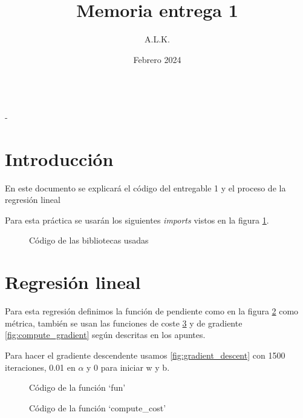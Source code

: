 \documentclass[6pt]{AiTex}
\title{Memoria entrega 1}
\author{A.L.K.}
\date{Febrero 2024}
\begin{document}
\justify

\begin{center}

    {\huge \textbf{\underline{\subtitulo}}} \\
    { \lesson - \autor}

\end{center}


\section*{Introducción}

En este documento se explicará el código del entregable 1 y el proceso de la regresión lineal

Para esta práctica se usarán los siguientes \textit{imports} vistos en la figura \ref{fig:imports}.
\begin{figure}[H]
    \centering
    
    \caption{Código de las bibliotecas usadas}
    \label{fig:imports}
\end{figure}

\section{Regresión lineal}

Para esta regresión definimos la función de pendiente como en la figura \ref{fig:fun} como métrica, también se usan las funciones de coste \ref{fig:compute_cost} y de gradiente \ref{fig:compute_gradient} según descritas en los apuntes.

Para hacer el gradiente descendente usamos \ref{fig:gradient_descent} con 1500 iteraciones, 0.01 en $\alpha$ y 0 para iniciar w y b.

\begin{figure}[H]
    \centering
    
    \caption{Código de la función `fun'}
    \label{fig:fun}
\end{figure}

\begin{figure}[H]
    \centering
    
    \caption{Código de la función `compute\_cost'}
    \label{fig:compute_cost}
\end{figure}
\end{document}
